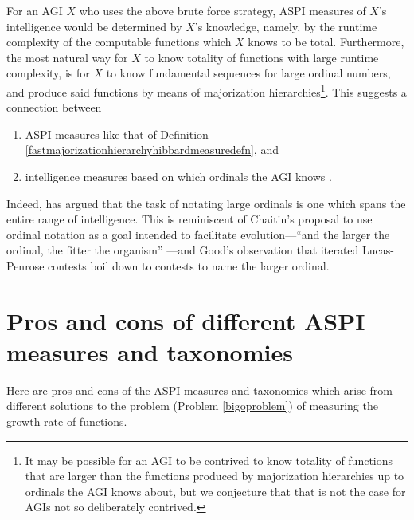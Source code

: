 \documentclass[twoside,11pt]{article}
\begin{document}
For an AGI $X$ who uses the above brute force strategy, ASPI
measures of $X$'s intelligence would be determined by $X$'s knowledge, namely,
by the runtime complexity of the computable functions which $X$ knows to be total.
Furthermore, the most natural way for $X$ to know totality of functions with large
runtime complexity, is for $X$ to know fundamental sequences for large ordinal
numbers, and produce said functions by means of majorization
hierarchies\footnote{It may be
possible for an AGI to be contrived to know totality of functions that are larger
than the functions produced by majorization hierarchies up to ordinals the AGI knows
about, but we conjecture that that is not the case for AGIs not so deliberately
contrived.}. This suggests a connection between
\begin{enumerate}
    \item
    ASPI measures like that of
    Definition \ref{fastmajorizationhierarchyhibbardmeasuredefn}, and
    \item
    intelligence measures based on which ordinals the AGI knows
    \citep{ioi1}.
\end{enumerate}
Indeed, \citet{ioi2} has argued that
the task of notating large ordinals is one which
spans the entire range of intelligence.
This is reminiscent of Chaitin's proposal to use ordinal notation
as a goal intended to facilitate evolution---``and the larger the ordinal,
the fitter the organism'' \citep{chaitin}---and Good's observation
\citep{good1969godel} that iterated Lucas-Penrose contests boil down to
contests to name the larger ordinal.


\section{Pros and cons of different ASPI measures and taxonomies}
\label{prosandconssection}

Here are pros and cons of the ASPI measures and taxonomies which arise
from different solutions
to the problem (Problem \ref{bigoproblem}) of measuring the growth rate of functions.
\end{document}
